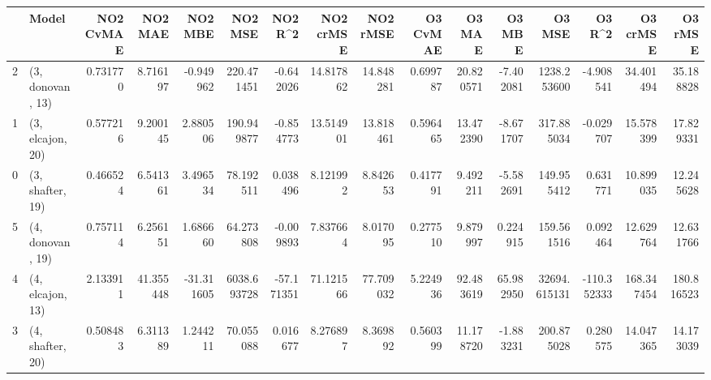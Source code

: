 \begin{tabular}{llrrrrrrrrrrrrrr}
\toprule
{} &             Model &  NO2 CvMAE &    NO2 MAE &    NO2 MBE &      NO2 MSE &    NO2 R\textasciicircum2 &  NO2 crMSE &   NO2 rMSE &  O3 CvMAE &     O3 MAE &     O3 MBE &        O3 MSE &      O3 R\textasciicircum2 &    O3 crMSE &     O3 rMSE \\
\midrule
2 &  (3, donovan, 13) &   0.731770 &   8.716197 &  -0.949962 &   220.471451 &  -0.642026 &  14.817862 &  14.848281 &  0.699787 &  20.820571 &  -7.402081 &   1238.253600 &   -4.908541 &   34.401494 &   35.188828 \\
1 &  (3, elcajon, 20) &   0.577216 &   9.200145 &   2.880506 &   190.949877 &  -0.854773 &  13.514901 &  13.818461 &  0.596465 &  13.472390 &  -8.671707 &    317.885034 &   -0.029707 &   15.578399 &   17.829331 \\
0 &  (3, shafter, 19) &   0.466524 &   6.541361 &   3.496534 &    78.192511 &   0.038496 &   8.121992 &   8.842653 &  0.417791 &   9.492211 &  -5.582691 &    149.955412 &    0.631771 &   10.899035 &   12.245628 \\
5 &  (4, donovan, 19) &   0.757114 &   6.256151 &   1.686660 &    64.273808 &  -0.009893 &   7.837664 &   8.017095 &  0.277510 &   9.879997 &   0.224915 &    159.561516 &    0.092464 &   12.629764 &   12.631766 \\
4 &  (4, elcajon, 13) &   2.133911 &  41.355448 & -31.311605 &  6038.693728 & -57.171351 &  71.121566 &  77.709032 &  5.224936 &  92.483619 &  65.982950 &  32694.615131 & -110.352333 &  168.347454 &  180.816523 \\
3 &  (4, shafter, 20) &   0.508483 &   6.311389 &   1.244211 &    70.055088 &   0.016677 &   8.276897 &   8.369892 &  0.560399 &  11.178720 &  -1.883231 &    200.875028 &    0.280575 &   14.047365 &   14.173039 \\
\bottomrule
\end{tabular}
